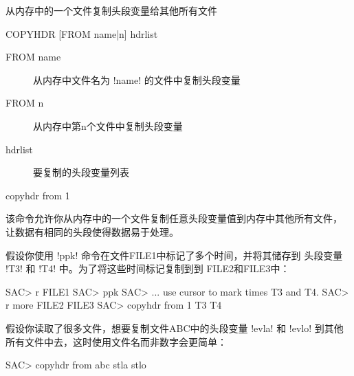 \label{cmd:copyhdr}

从内存中的一个文件复制头段变量给其他所有文件

\begin{SACSTX}
COPYHDR [FROM name|n] hdrlist
\end{SACSTX}

\begin{description}
\item [FROM name] 从内存中文件名为 !name! 的文件中复制头段变量
\item [FROM n] 从内存中第n个文件中复制头段变量
\item [hdrlist] 要复制的头段变量列表
\end{description}

\begin{SACDFT}
copyhdr from 1
\end{SACDFT}

该命令允许你从内存中的一个文件复制任意头段变量值到内存中其他所有文件，
让数据有相同的头段使得数据易于处理。

假设你使用 !ppk! 命令在文件FILE1中标记了多个时间，并将其储存到
头段变量 !T3! 和 !T4! 中。为了将这些时间标记复制到到
FILE2和FILE3中：
\begin{SACCode}
SAC> r FILE1
SAC> ppk
SAC> ... use cursor to mark times T3 and T4.
SAC> r more FILE2 FILE3
SAC> copyhdr from 1 T3 T4
\end{SACCode}

假设你读取了很多文件，想要复制文件ABC中的头段变量 !evla! 和
!evlo! 到其他所有文件中去，这时使用文件名而非数字会更简单：
\begin{SACCode}
SAC> copyhdr from abc stla stlo
\end{SACCode}
